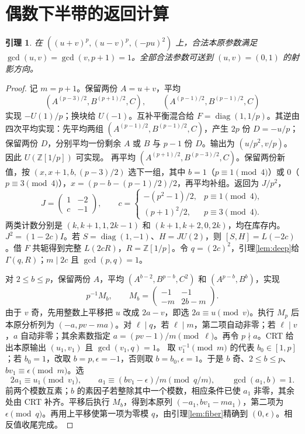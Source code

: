 \documentclass[11pt,a4paper]{article}
\newcommand{\Z}{\mathbb Z}
\newcommand{\diag}{\operatorname{diag}}
\newtheorem{lemma}[theorem]{引理}
\theoremstyle{definition}
\numberwithin{equation}{section}
\begin{document}
\section{偶数下半带的返回计算}\label{app:lower}
\begin{lemma}\label{lem:two-carrier}
在 $((u+v)^p,(u-v)^p,(-pu)^2)$ 上，合法本原参数满足 $\gcd(u,v)=\gcd(v,p+1)=1$。全部合法参数可送到 $(u,v)=(0,1)$ 的射影方向。
\end{lemma}
\begin{proof}
记 $m=p+1$。保留两份 $A=u+v$，平均
\[(A^{(p-3)/2},B^{(p+1)/2},C),\qquad
(A^{(p-1)/2},B^{(p-1)/2},C)
\]
实现 $-U(1)/p$；换块给 $U(-1)$。互补平衡混合给 $F=\diag(1,1/p)$。其逆由四次平均实现：先平均两组 $(A^{(p-1)/2},B^{(p-1)/2},C)$，产生 $2p$ 份 $D=-u/p$；保留两份 $D$，分别平均一份剩余 $A$ 或 $B$ 与 $p-1$ 份 $D$。输出为 $(u/p^2,v/p)$。因此 $U(\Z[1/p])$ 可实现。
再平均 $(A^{(p+1)/2},B^{(p-3)/2},C)$。保留两份新值，按 $(x,x+1,b,(p-3)/2)$ 选下一组，其中 $b=1$（$p\equiv1\pmod4$）或 $0$（$p\equiv3\pmod4$），$x=(p-b-(p-1)/2)/2$，再平均补组。返回为 $J/p^2$，
\[
J=\begin{pmatrix}1&-2\\c&-1\end{pmatrix},\qquad
c=\begin{cases}-(p^2-1)/2,&p\equiv1\pmod4,\\(p+1)^2/2,&p\equiv3\pmod4.
\end{cases}
\]
两类计数分别是 $(k,k+1,1,2k-1)$ 和 $(k+1,k+2,0,2k)$，均在库存内。$J^2=(1-2c)I$。若 $S=\diag(1,-1)$、$H=JU(2)$，则 $[S,H]=L(-2c)$。借 $F$ 共轭得到完整 $L(2cR)$，$R=\Z[1/p]$。令 $q=(2c)^2$，引理\ref{lem:deep}给 $\Gamma(q,R)$；$m\mid2c$ 且 $\gcd(p,q)=1$。

对 $2\le b\le p$，保留两份 $A$，平均 $(A^{b-2},B^{p-b},C^2)$ 和 $(A^{p-b},B^b)$，实现
\[
p^{-1}M_b,\qquad M_b=\begin{pmatrix}-1&-1\\-m&2b-m\end{pmatrix}.
\]
由于 $v$ 奇，先用整数上平移把 $u$ 改成 $2a-v$，即选 $2a\equiv u\pmod v$。执行 $M_p$ 后本原分析列为 $(-a,pv-ma)$。对 $\ell\mid q$，若 $\ell\mid m$，第二项自动非零；若 $\ell\mid v$，$a$ 自动非零；其余素数指定 $a=(pv-1)/m\pmod\ell$。再令 $p\nmid a$。CRT 给出本原输出 $(u_1,v_1)$ 且 $\gcd(v_1,q)=1$。
取 $v_1^{-1}\pmod m$ 的代表 $b_0\in[1,p]$；若 $b_0=1$，改取 $b=p,\epsilon=-1$，否则取 $b=b_0,\epsilon=1$。于是 $b$ 奇、$2\le b\le p$、$bv_1\equiv\epsilon\pmod m$。选
\[
2a_1\equiv u_1\pmod{v_1},\qquad
a_1\equiv(bv_1-\epsilon)/m\pmod{q/m},\qquad \gcd(a_1,b)=1.
\]
前两个模数互素；$b$ 的素因子若整除其中一个模数，相应条件已使 $a_1$ 非零，其余处由 CRT 补齐。平移后执行 $M_b$，得到本原列 $(-a_1,bv_1-ma_1)$，第二项为 $\epsilon\pmod q$。再用上平移使第一项为零模 $q$，由引理\ref{lem:fiber}精确到 $(0,\epsilon)$。相反值收尾完成。
\end{proof}
\end{document}
